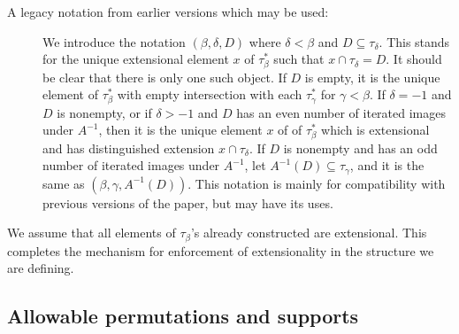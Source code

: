 \documentclass[112pt]{article}
\begin{document}
\begin{description}
\item[A legacy notation from earlier versions which may be used:]  We introduce the notation $(\beta,\delta,D)$ where $\delta<\beta$ and  $D \subseteq \tau_\delta$.   This stands for the unique extensional element $x$ of $\tau_\beta^*$ such that $x \cap \tau_\delta = D$.  It should be clear that there is only one such object.  If $D$ is empty, it is the unique
element of $\tau_\beta^*$ with empty intersection with each $\tau_\gamma^*$ for $\gamma<\beta$.  If $\delta=-1$ and $D$ is nonempty, or if $\delta >-1$
and $D$ has an even number of iterated images under $A^{-1}$, then it is the unique element $x$ of of $\tau_\beta^*$ which is extensional and has distinguished extension $x \cap \tau_\delta$.  If $D$ is nonempty and has an odd number of iterated images under $A^{-1}$, let $A^{-1}(D) \subseteq \tau_\gamma$, and it is the same as $(\beta,\gamma,A^{-1}(D))$.  This notation is mainly for compatibility with previous versions of the paper, but may have its uses.

\end{description}

We assume that all elements of $\tau_\beta$'s already constructed are extensional.  This completes the mechanism for enforcement of extensionality in the structure we are defining.

\subsection{Allowable permutations and supports}
\end{document}
